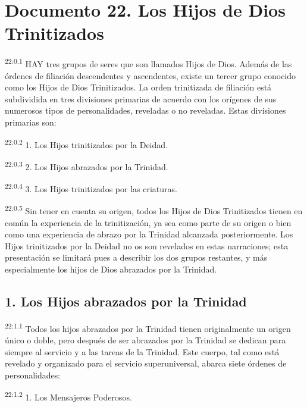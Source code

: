 \chapter{Documento 22. Los Hijos de Dios Trinitizados}
\par
\textsuperscript{22:0.1} HAY tres grupos de seres que son llamados Hijos de Dios. Además de las órdenes de filiación descendentes y ascendentes, existe un tercer grupo conocido como los Hijos de Dios Trinitizados. La orden trinitizada de filiación está subdividida en tres divisiones primarias de acuerdo con los orígenes de sus numerosos tipos de personalidades, reveladas o no reveladas. Estas divisiones primarias son:

\par
\textsuperscript{22:0.2} 1. Los Hijos trinitizados por la Deidad.

\par
\textsuperscript{22:0.3} 2. Los Hijos abrazados por la Trinidad.

\par
\textsuperscript{22:0.4} 3. Los Hijos trinitizados por las criaturas.

\par
\textsuperscript{22:0.5} Sin tener en cuenta su origen, todos los Hijos de Dios Trinitizados tienen en común la experiencia de la trinitización, ya sea como parte de su origen o bien como una experiencia de abrazo por la Trinidad alcanzada posteriormente. Los Hijos trinitizados por la Deidad no os son revelados en estas narraciones; esta presentación se limitará pues a describir los dos grupos restantes, y más especialmente los hijos de Dios abrazados por la Trinidad.

\section*{1. Los Hijos abrazados por la Trinidad}
\par
\textsuperscript{22:1.1} Todos los hijos abrazados por la Trinidad tienen originalmente un origen único o doble, pero después de ser abrazados por la Trinidad se dedican para siempre al servicio y a las tareas de la Trinidad. Este cuerpo, tal como está revelado y organizado para el servicio superuniversal, abarca siete órdenes de personalidades:

\par
\textsuperscript{22:1.2} 1. Los Mensajeros Poderosos.

